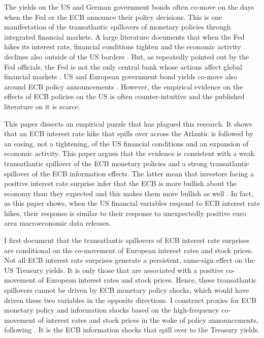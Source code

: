 \documentclass[a4paper,12pt]{article}
\begin{document}
The yields on the US and German government bonds often co-move on the days when the Fed or the ECB announce their policy decisions.
This is one manifestation of the transatlantic spillovers of monetary policies through integrated financial markets.
A large literature documents that when the Fed hikes its interest rate, financial conditions tighten and the economic activity declines also outside of the US borders \citep[][and many others]{Rey_2013,MirandaAgrippino_Rey_2020}. 
But, as repeatedly pointed out by the Fed officials, the Fed is not the only central bank whose actions affect global financial markets \citep[e.g.][]{Powell_2018,Clarida_2021}.
US and European government bond yields co-move also around ECB policy announcements \citep[e.g.][]{Curcuru_etal_2018}.
However, the empirical evidence on the effects of ECB policies on the US is often counter-intuitive and the published literature on it is scarce.

This paper dissects an empirical puzzle that has plagued this research. It
shows that an ECB interest rate hike that spills over across the Atlantic is followed
by an easing, not a tightening, of the US financial conditions and an expansion of economic activity.
This paper argues that the evidence is consistent with a weak transatlantic spillover of the ECB monetary policies and
a strong transatlantic spillover of the ECB information effects. 
The latter mean that investors facing a positive interest rate
surprise infer that the ECB is more bullish about the economy than they expected and this makes them more bullish as well \citep{Romer_Romer_2000,Nakamura_Steinsson_2018}.
 In fact, as this paper shows, when the US financial variables respond to ECB interest rate hikes,
their response is similar to their response to unexpectedly positive euro area macroeconomic data releases.

I first document that the transatlantic spillovers of ECB interest rate surprises are conditional
on the co-movement of European interest rates and stock prices.
Not all ECB interest rate surprises generate a persistent, same-sign effect on the US Treasury yields.
It is only those that are associated with a positive co-movement of European interest rates and stock prices.
Hence, these transatlantic spillovers cannot be driven by ECB monetary policy shocks,
which would have driven these two variables in the opposite directions.
I construct proxies for ECB monetary policy and information shocks based on the
high-frequency co-movement of interest rates and stock prices in the wake of policy announcements, following \cite{Jarocinski_Karadi_2020}.
It is the ECB information shocks that spill over to the Treasury yields.
\end{document}
